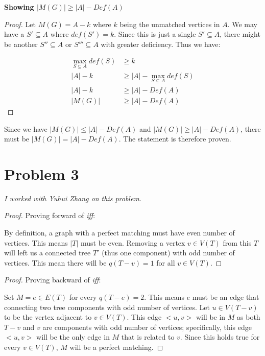 \documentclass[11pt]{article}
\begin{document}
\textbf{Showing $|M(G)| \geq |A| - Def(A)$}
\begin{proof}
Let $M(G) = A - k$ where $k$ being the unmatched vertices in $A$. We may have a $S' \subseteq A$ where $def(S') = k$. Since this is just a single $S' \subseteq A$, there might be another $S'' \subseteq A$ or $S''' \subseteq A$ with greater deficiency. Thus we have:

\begin{align*}
    \max_{S \subseteq A} def(S) &\geq k \\
    |A| - k &\geq |A| - \max_{S \subseteq A} def(S) \\
    |A| - k &\geq |A| - Def(A) \\
    |M(G)|  &\geq |A| - Def(A)
\end{align*}

\end{proof}

Since we have $|M(G)| \leq |A| - Def(A)$ and $|M(G)| \geq |A| - Def(A)$, there must be $|M(G)| = |A| - Def(A)$. The statement is therefore proven.


\section{Problem 3}

\textit{I worked with Yuhui Zhang on this problem.\newline}

\begin{proof}
Proving forward of \textit{iff}:

By definition, a graph with a perfect matching must have even number of vertices. This means $|T|$ must be even. Removing a vertex $v \in V(T)$ from this $T$ will left us a connected tree $T'$ (thus one component) with odd number of vertices. This mean there will be $q(T-v) = 1$ for all $v \in V(T)$.
\end{proof}

\begin{proof}
Proving backward of \textit{iff}:

Set $M = {e \in E(T)}$ for every $q(T-e) = 2$. This means $e$ must be an edge that connecting two tree components with odd number of vertices. Let $u \in V(T-v)$ to be the vertex adjacent to $v \in V(T)$. This edge $<u, v>$ will be in $M$ as both $T-v$ and $v$ are components with odd number of vertices; specifically, this edge $<u, v>$ will be the only edge in $M$ that is related to $v$. Since this holds true for every $v \in V(T)$, $M$ will be a perfect matching.

\end{proof}



%
% 
% 
\end{document}
